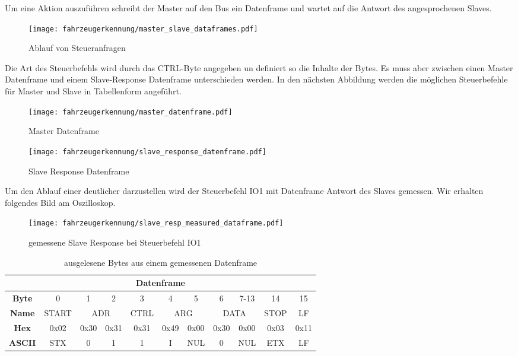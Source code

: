 Um eine Aktion auszuführen schreibt der Master auf den Bus ein Datenframe und wartet auf die Antwort des angesprochenen Slaves. 

\begin{figure}[H]
    \centering
    \texttt{[image: fahrzeugerkennung/master\_slave\_dataframes.pdf]}
    \caption{Ablauf von Steueranfragen}
\end{figure}

Die Art des Steuerbefehls wird durch das CTRL-Byte angegeben un definiert so die Inhalte der Bytes. Es muss aber zwischen einen Master Datenframe und einem Slave-Response Datenframe unterschieden werden. 
In den nächsten Abbildung werden die möglichen Steuerbefehle für Master und Slave in Tabellenform angeführt.

\begin{sidewaysfigure}
    \centering
    \texttt{[image: fahrzeugerkennung/master\_datenframe.pdf]}
    \caption{Master Datenframe}
\end{sidewaysfigure}

\begin{sidewaysfigure}
    \centering
    \texttt{[image: fahrzeugerkennung/slave\_response\_datenframe.pdf]}
    \caption{Slave Response Datenframe}
\end{sidewaysfigure}
\pagebreak
Um den Ablauf einer deutlicher darzustellen wird der Steuerbefehl IO1 mit Datenframe Antwort des Slaves gemessen. 
Wir erhalten folgendes Bild am Oszilloskop.

\begin{figure}[H]
    \centering
    \texttt{[image: fahrzeugerkennung/slave\_resp\_measured\_dataframe.pdf]}
    \caption{gemessene Slave Response bei Steuerbefehl IO1}
\end{figure}

\begin{table}[h]
    \centering
    \begin{tabular}{|c|c|c|c|c|c|c|c|c|l|l|l|l|l|l|c|c|}
        \hline
        \multicolumn{17}{|c|}{\textbf{Datenframe}}                                                                                           \\ \hline
        \textbf{Byte}  & 0     & 1           & 2          & 3    & 4           & 5          & 6    & \multicolumn{7}{c|}{7-13} & 14   & 15   \\ \hline
        \textbf{Name}  & START & \multicolumn{2}{c|}{ADR} & CTRL & \multicolumn{2}{c|}{ARG} & \multicolumn{8}{c|}{DATA}        & STOP & LF   \\ \hline
        \textbf{Hex}   & 0x02  & 0x30        & 0x31       & 0x31 & 0x49        & 0x00       & 0x30 & \multicolumn{7}{c|}{0x00} & 0x03 & 0x11 \\ \hline
        \textbf{ASCII} & STX   & 0           & 1          & 1    & I           & NUL        & 0    & \multicolumn{7}{c|}{NUL}  & ETX  & LF   \\ \hline
    \end{tabular}
    \caption{ausgelesene Bytes aus einem gemessenen Datenframe}
\end{table}

